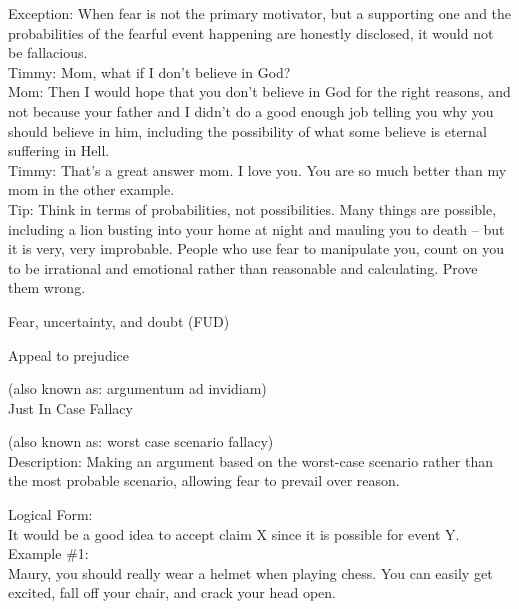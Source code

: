 \documentclass[a4paper,12pt,single,pdftex]{scrartcl}
\begin{document}
{    
      Exception: When fear is not the primary motivator, but a supporting one and the probabilities of the fearful event happening are honestly disclosed, it would not be fallacious.
    \\

    
      Timmy: Mom, what if I don’t believe in God?
    \\

    
      Mom: Then I would hope that you don’t believe in God for the right reasons, and not because your father and I didn’t do a good enough job telling you why you should believe in him, including the possibility of what some believe is eternal suffering in Hell.
    \\

    
      Timmy: That’s a great answer mom.  I love you.  You are so much better than my mom in the other example.
    \\

    
      Tip: Think in terms of probabilities, not possibilities.  Many things are possible, including a lion busting into your home at night and mauling you to death -- but it is very, very improbable.  People who use fear to manipulate you, count on you to be irrational and emotional rather than reasonable and calculating.  Prove them wrong.
    \\

  }


 Fear, uncertainty, and doubt (FUD)

Appeal to prejudice
    
      (also known as: argumentum ad invidiam)
    \\

  

Just In Case Fallacy
    
      (also known as: worst case scenario fallacy)
    \\

  
    Description: Making an argument based on the worst-case scenario rather than the most probable scenario, allowing fear to prevail over reason.

    
      Logical Form:
    \\

    
      It would be a good idea to accept claim X since it is possible for event Y.
    \\

    
      Example \#1:
    \\

    
      Maury, you should really wear a helmet when playing chess.  You can easily get excited, fall off your chair, and crack your head open.
    \\
\end{document}
